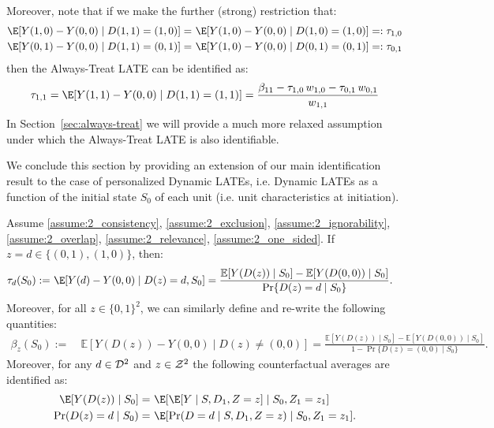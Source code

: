 Moreover, note that if we make the further (strong) restriction that:
\begin{equation}\label{eqn:strong-ass}
\begin{aligned}
    \E[Y(1,0) - Y(0,0) \mid D(1,1)=(1,0)] =~& \E[Y(1,0) - Y(0,0) \mid D(1,0)=(1,0)] =: \tau_{1,0}\\
    \E[Y(0,1) - Y(0,0) \mid D(1,1)=(0,1)] =~& \E[Y(1,0) - Y(0,0) \mid D(0,1)=(0,1)] =: \tau_{0,1}
\end{aligned}
\end{equation}
then the Always-Treat LATE can be identified as:
\begin{align}\label{eqn:easy-always-treat}
    \tau_{1,1} = \E[Y(1,1)-Y(0,0)\mid D(1,1)=(1,1)] = \frac{\beta_{11} - \tau_{1,0}\,w_{1,0} - \tau_{0,1}\,w_{0,1}}{w_{1,1}}
\end{align}
In Section~\ref{sec:always-treat} we will provide a much more relaxed assumption under which the Always-Treat LATE is also identifiable.

We conclude this section by providing an extension of our main identification result to the case of personalized Dynamic LATEs, i.e. Dynamic LATEs as a function of the initial state $S_0$ of each unit (i.e. unit characteristics at initiation).


\begin{theorem}\label{thm:2_identification_hetero}
Assume
 \ref{assume:2_consistency}, 
 \ref{assume:2_exclusion},
 \ref{assume:2_ignorability}, \ref{assume:2_overlap}, \ref{assume:2_relevance}, \ref{assume:2_one_sided}.
If $z=d\in\{(0,1), (1,0)\}$, then: 
\begin{align*}
\tau_d(S_0) :=~& \E[Y(d) - Y(0,0) \mid D(z)=d, S_0]
 =\frac{
    \mathbb{E}[Y(D(z)) \mid S_0]
    - \mathbb{E}[Y(D(0,0)) \mid S_0]
  }{\Pr\{ D(z)=d \mid S_0\}
  }.
\end{align*}
Moreover, for all $z \in \{0,1\}^2$, we can similarly define and re-write the following quantities: 
\begin{align*}
\beta_z(S_0) :=~& \mathbb{E}[Y(D(z)) - Y(0,0)\mid D(z) \neq (0,0)]
 =\frac{
    \mathbb{E}[ Y(D(z)) \mid S_0]
    - \mathbb{E}[ Y(D(0,0)) \mid S_0]
  }{1 - \Pr\{ D(z)=(0,0) \mid S_0\}
  }.
\end{align*}
Moreover, for any $d\in {\cal D}^2$ and $z\in {\cal Z}^2$ the following counterfactual averages are identified as: 
\begin{align}
\E[Y(D(z))\mid S_0]
=~&\E[\E[Y \mid S, D_1, Z=z] \mid S_0, Z_1=z_1]\\
\Pr(D(z)=d\mid S_0)
=~& \E[\Pr(D=d\mid S, D_1, Z=z)\mid S_0, Z_1=z_1].
\end{align}
\end{theorem}




